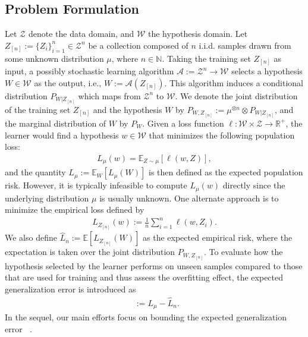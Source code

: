 \documentclass[onecolumn,romanappendices,10pt]{IEEEtran}
\newcommand{\Acal}{{\mathcal A}}
\newcommand{\Wcal}{{\mathcal W}}
\newcommand{\Zcal}{{\mathcal Z}}
\newcommand{\EE}{{\mathbb{E}}}
\newcommand{\RR}{{\mathbb{R}}}
\newcommand{\NN}{{\mathbb{N}}}
\DeclareMathOperator{\gen}{\overline{gen}}
\begin{document}
	\subsection{Problem Formulation} \label{subsec:pbl_setup}
	Let $\Zcal$ denote the data domain, and $\Wcal$ the hypothesis domain. Let $Z_{[n]} := \{Z_i\}_{i=1}^n \in \Zcal^n$ be a collection composed of $n$ i.i.d. samples drawn from some unknown distribution $\mu$, where $n \in \NN$. Taking the training set $Z_{[n]}$ as input, a possibly stochastic learning algorithm $\Acal := \Zcal^n \to \Wcal$ selects a hypothesis $W \in \Wcal$ as the output, i.e., $W := \Acal(Z_{[n]})$. This algorithm induces a conditional distribution $P_{W | Z_{[n]}}$ which maps from $\Zcal^n$ to $\Wcal$. We denote the joint distribution of the training set $Z_{[n]}$ and the hypothesis $W$ by $P_{W,Z_{[n]}} := \mu^{\otimes n} \otimes P_{W|Z_{[n]}}$, and the marginal distribution of $W$ by $P_W$. Given a loss function $\ell : \Wcal \times \Zcal \to \RR^+$, the learner would find a hypothesis $w \in \Wcal$ that minimizes the following population loss:
	\begin{equation}
		\begin{aligned}
			L_\mu(w) = \EE_{Z \sim \mu} \left[ \ell(w, Z) \right],
		\end{aligned}
		\label{eq:def-pop-loss}
	\end{equation}
	and the quantity $L_\mu := \EE_W [L_\mu(W)]$ is then defined as the expected population risk. However, it is typically infeasible to compute $L_\mu(w)$ directly since the underlying distribution $\mu$ is usually unknown. One alternate approach is to minimize the empirical loss defined by
	\begin{equation}
		\begin{aligned}
			L_{Z_{[n]}}(w) := \frac{1}{n} \sum_{i=1}^{n} \ell(w, Z_i).
		\end{aligned}
		\label{eq:def-emp-loss}
	\end{equation}
	We also define $\widehat{L}_n := \EE [L_{Z_{[n]}}(W)]$ as the expected empirical risk, where the expectation is taken over the joint distribution $P_{W,Z_{[n]}}$. To evaluate how the hypothesis selected by the learner performs on unseen samples compared to those that are used for training and thus assess the overfitting effect, the expected generalization error is introduced as
	\begin{equation}
		\begin{aligned}
			\gen := L_\mu - \widehat{L}_n.
		\end{aligned}
		\label{eq:def-gen}
	\end{equation}
	In the sequel, our main efforts focus on bounding the expected generalization error $\gen$.
	
\end{document}
